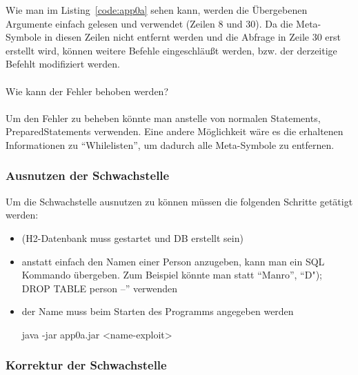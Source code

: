 \documentclass[12pt,a4paper,titlepage,oneside]{scrartcl}
\begin{document}
Wie man im Listing~\ref*{code:app0a} sehen kann, werden die Übergebenen Argumente einfach gelesen und verwendet (Zeilen 8 und 30). Da die Meta-Symbole in diesen Zeilen nicht entfernt werden und die Abfrage in Zeile 30 erst erstellt wird, können weitere Befehle eingeschläußt werden, bzw. der derzeitige Befehlt modifiziert werden. \\
\\
Wie kann der Fehler behoben werden? \\
\\
Um den Fehler zu beheben könnte man anstelle von normalen Statements, PreparedStatements verwenden. Eine andere Möglichkeit wäre es die erhaltenen Informationen zu "`Whilelisten"', um dadurch alle Meta-Symbole zu entfernen.

\subsubsection{Ausnutzen der Schwachstelle}

Um die Schwachstelle ausnutzen zu können müssen die folgenden Schritte getätigt werden:
\begin{itemize}
\item (H2-Datenbank muss gestartet und DB erstellt sein)
\item anstatt einfach den Namen einer Person anzugeben, kann man ein SQL Kommando übergeben. Zum Beispiel könnte man statt "`Manro"', "`D"); DROP TABLE person --"' verwenden
\item der Name muss beim Starten des Programms angegeben werden
	\begin{center}
	java -jar app0a.jar <name-exploit>
	\end{center}
\end{itemize}

\subsubsection{Korrektur der Schwachstelle}
\end{document}
